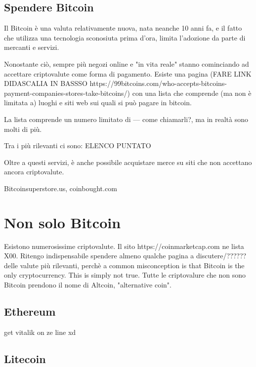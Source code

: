 \documentclass {article}
\begin{document}
\subsection {Spendere Bitcoin}



Il Bitcoin è una valuta relativamente nuova, nata neanche 10 anni fa, e il fatto che utilizza una tecnologia sconosiuta prima d'ora, limita l'adozione da parte di mercanti e servizi.

Nonostante ciò, sempre più negozi online e "in vita reale" stanno cominciando ad accettare criptovalute come forma di pagamento. Esiste una pagina (FARE LINK DIDASCALIA IN BASSSO https://99bitcoins.com/who-accepts-bitcoins-payment-companies-stores-take-bitcoins/) con una lista che comprende (ma non è limitata a) luoghi e siti web sui quali si può pagare in bitcoin.

La lista comprende un numero limitato di --- come chiamarli?, ma in realtà sono molti di più.

Tra i più rilevanti ci sono: ELENCO PUNTATO

Oltre a questi servizi, è anche possibile acquistare merce su siti che non accettano ancora criptovalute.

Bitcoinsuperstore.us, coinbought.com



\section {Non solo Bitcoin}



Esistono numerosissime criptovalute. Il sito https://coinmarketcap.com ne lista X00. Ritengo indispensabile spendere almeno qualche pagina a discutere/?????? delle valute più rilevanti, perchè a common misconception is that Bitcoin is the only cryptocurrency. This is simply not true. Tutte le criptovalure che non sono Bitcoin prendono il nome di Altcoin, "alternative coin".



\subsection {Ethereum}



get vitalik on ze line xd



\subsection {Litecoin}
\end{document}
